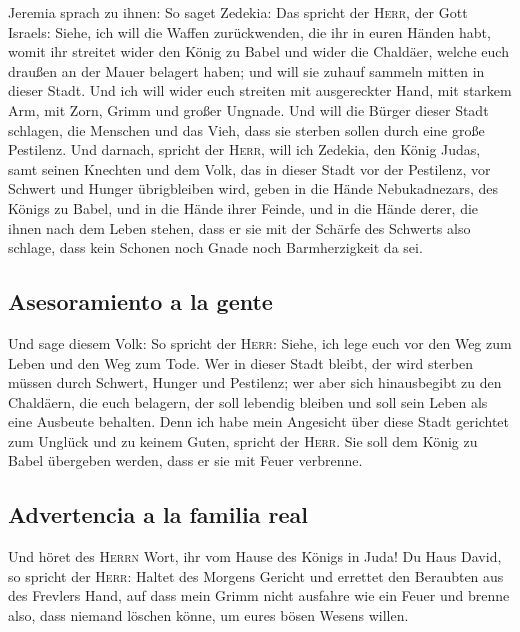  Jeremia sprach zu ihnen: So saget Zedekia: 
Das spricht der \textsc{Herr}, der Gott Israels: Siehe, ich will die
Waffen zurückwenden, die ihr in euren Händen habt, womit ihr streitet
wider den König zu Babel und wider die Chaldäer, welche euch draußen an
der Mauer belagert haben; und will sie zuhauf sammeln mitten in dieser
Stadt.  Und ich will wider euch streiten mit ausgereckter
Hand, mit starkem Arm, mit Zorn, Grimm und großer Ungnade.
 Und will die Bürger dieser Stadt schlagen, die Menschen
und das Vieh, dass sie sterben sollen durch eine große Pestilenz.
 Und darnach, spricht der \textsc{Herr}, will ich Zedekia,
den König Judas, samt seinen Knechten und dem Volk, das in dieser Stadt
vor der Pestilenz, vor Schwert und Hunger übrigbleiben wird, geben in
die Hände Nebukadnezars, des Königs zu Babel, und in die Hände ihrer
Feinde, und in die Hände derer, die ihnen nach dem Leben stehen, dass er
sie mit der Schärfe des Schwerts also schlage, dass kein Schonen noch
Gnade noch Barmherzigkeit da sei.

\hypertarget{asesoramiento-a-la-gente}{%
\subsection{Asesoramiento a la gente}\label{asesoramiento-a-la-gente}}

 Und sage diesem Volk: So spricht der \textsc{Herr}:
Siehe, ich lege euch vor den Weg zum Leben und den Weg zum Tode.
 Wer in dieser Stadt bleibt, der wird sterben müssen durch
Schwert, Hunger und Pestilenz; wer aber sich hinausbegibt zu den
Chaldäern, die euch belagern, der soll lebendig bleiben und soll sein
Leben als eine Ausbeute behalten.  Denn ich habe mein
Angesicht über diese Stadt gerichtet zum Unglück und zu keinem Guten,
spricht der \textsc{Herr}. Sie soll dem König zu Babel übergeben werden,
dass er sie mit Feuer verbrenne.

\hypertarget{advertencia-a-la-familia-real}{%
\subsection{Advertencia a la familia
real}\label{advertencia-a-la-familia-real}}

 Und höret des \textsc{Herrn} Wort, ihr vom Hause des
Königs in Juda!  Du Haus David, so spricht der
\textsc{Herr}: Haltet des Morgens Gericht und errettet den Beraubten aus
des Frevlers Hand, auf dass mein Grimm nicht ausfahre wie ein Feuer und
brenne also, dass niemand löschen könne, um eures bösen Wesens willen.

